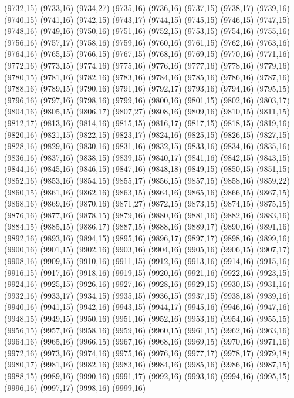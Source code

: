 (9732,15)
(9733,16)
(9734,27)
(9735,16)
(9736,16)
(9737,15)
(9738,17)
(9739,16)
(9740,15)
(9741,16)
(9742,15)
(9743,17)
(9744,15)
(9745,15)
(9746,15)
(9747,15)
(9748,16)
(9749,16)
(9750,16)
(9751,16)
(9752,15)
(9753,15)
(9754,16)
(9755,16)
(9756,16)
(9757,17)
(9758,16)
(9759,16)
(9760,16)
(9761,15)
(9762,16)
(9763,16)
(9764,16)
(9765,15)
(9766,15)
(9767,15)
(9768,16)
(9769,15)
(9770,16)
(9771,16)
(9772,16)
(9773,15)
(9774,16)
(9775,16)
(9776,16)
(9777,16)
(9778,16)
(9779,16)
(9780,15)
(9781,16)
(9782,16)
(9783,16)
(9784,16)
(9785,16)
(9786,16)
(9787,16)
(9788,16)
(9789,15)
(9790,16)
(9791,16)
(9792,17)
(9793,16)
(9794,16)
(9795,15)
(9796,16)
(9797,16)
(9798,16)
(9799,16)
(9800,16)
(9801,15)
(9802,16)
(9803,17)
(9804,16)
(9805,15)
(9806,17)
(9807,27)
(9808,16)
(9809,16)
(9810,15)
(9811,15)
(9812,17)
(9813,16)
(9814,16)
(9815,15)
(9816,17)
(9817,15)
(9818,15)
(9819,16)
(9820,16)
(9821,15)
(9822,15)
(9823,17)
(9824,16)
(9825,15)
(9826,15)
(9827,15)
(9828,16)
(9829,16)
(9830,16)
(9831,16)
(9832,15)
(9833,16)
(9834,16)
(9835,16)
(9836,16)
(9837,16)
(9838,15)
(9839,15)
(9840,17)
(9841,16)
(9842,15)
(9843,15)
(9844,16)
(9845,16)
(9846,15)
(9847,16)
(9848,18)
(9849,15)
(9850,15)
(9851,15)
(9852,16)
(9853,16)
(9854,15)
(9855,17)
(9856,15)
(9857,15)
(9858,16)
(9859,22)
(9860,15)
(9861,16)
(9862,16)
(9863,15)
(9864,16)
(9865,16)
(9866,15)
(9867,15)
(9868,16)
(9869,16)
(9870,16)
(9871,27)
(9872,15)
(9873,15)
(9874,15)
(9875,15)
(9876,16)
(9877,16)
(9878,15)
(9879,16)
(9880,16)
(9881,16)
(9882,16)
(9883,16)
(9884,15)
(9885,15)
(9886,17)
(9887,15)
(9888,16)
(9889,17)
(9890,16)
(9891,16)
(9892,16)
(9893,16)
(9894,15)
(9895,16)
(9896,17)
(9897,17)
(9898,16)
(9899,16)
(9900,16)
(9901,15)
(9902,16)
(9903,16)
(9904,16)
(9905,16)
(9906,15)
(9907,17)
(9908,16)
(9909,15)
(9910,16)
(9911,15)
(9912,16)
(9913,16)
(9914,16)
(9915,16)
(9916,15)
(9917,16)
(9918,16)
(9919,15)
(9920,16)
(9921,16)
(9922,16)
(9923,15)
(9924,16)
(9925,15)
(9926,16)
(9927,16)
(9928,16)
(9929,15)
(9930,15)
(9931,16)
(9932,16)
(9933,17)
(9934,15)
(9935,15)
(9936,15)
(9937,15)
(9938,18)
(9939,16)
(9940,16)
(9941,15)
(9942,16)
(9943,15)
(9944,17)
(9945,16)
(9946,16)
(9947,16)
(9948,15)
(9949,15)
(9950,16)
(9951,16)
(9952,16)
(9953,16)
(9954,16)
(9955,15)
(9956,15)
(9957,16)
(9958,16)
(9959,16)
(9960,15)
(9961,15)
(9962,16)
(9963,16)
(9964,16)
(9965,16)
(9966,15)
(9967,16)
(9968,16)
(9969,15)
(9970,16)
(9971,16)
(9972,16)
(9973,16)
(9974,16)
(9975,16)
(9976,16)
(9977,17)
(9978,17)
(9979,18)
(9980,17)
(9981,16)
(9982,16)
(9983,16)
(9984,16)
(9985,16)
(9986,16)
(9987,15)
(9988,15)
(9989,16)
(9990,16)
(9991,17)
(9992,16)
(9993,16)
(9994,16)
(9995,15)
(9996,16)
(9997,17)
(9998,16)
(9999,16)
